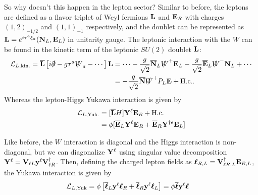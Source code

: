 So why doesn't this happen in the lepton sector? Similar to before, the leptons are defined as a flavor triplet of Weyl fermions ${\bf L}$ and ${\bf E}_R$ with charges $(1, 2)_{-1/2}$ and $(1, 1)_{-1}$ respectively, and the doublet can be represented as ${\bf L} = e^{i\tau^a\xi_a}({\bf N}_L, {\bf E}_L)$ in unitarity gauge. The leptonic interaction with the $W$ can be found in the kinetic term of the leptonic $SU(2)$ doublet ${\bf L}$:
\begin{align}
{\cal L}_{L,{\rm kin}.} = \overline{\bf L}\left[i\slashed{\partial} - g\tau^a \slashed{W}_a - \cdots \right]{\bf L} &= \cdots -\frac{g}{\sqrt{2}}\overline{\bf N}_L\slashed{W}^+{\bf E}_L -\frac{g}{\sqrt{2}}\overline{\bf E}_L\slashed{W}^-{\bf N}_L + \cdots \nonumber \\
&= -\frac{g}{\sqrt{2}}\overline{\bf N}\slashed{W}^+P_L{\bf E} + {\rm H.c.}.
\end{align}
Whereas the lepton-Higgs Yukawa interaction is given by
\begin{align}
{\cal L}_{L,{\rm Yuk}.} &= [\overline{\bf L}H]{\bf Y}^\ell{\bf E}_R + {\rm H.c.}\nonumber \\
&= \phi [\overline{\bf E}_L{\bf Y}^\ell{\bf E}_R+\overline{\bf E}_R{\bf Y}^{\dagger e}{\bf E}_L]
\end{align}

Like before, the $W$ interaction is diagonal and the Higgs interaction is non-diagonal, but we can diagonalize ${\bf Y}^\ell$ using singular value decomposition ${\bf Y}^\ell = {\bf V}_{\ell L} {\bf y}^\ell{\bf V}_{\ell R}^\dagger$. Then, defining the charged lepton fields as ${\boldsymbol\ell}_{R,L} = {\bf V}_{\ell R,L}^\dagger{\bf E}_{R,L}$, the Yukawa interaction is given by
\begin{align}
    {\cal L}_{L,{\rm Yuk}} &= \phi\left[\overline{\boldsymbol \ell}_L{\bf y}^\ell {\boldsymbol \ell}_R + \overline{\boldsymbol \ell}_R{\bf y}^\ell {\boldsymbol \ell}_L\right]= \phi \overline{\boldsymbol \ell}{\bf y}^\ell{\boldsymbol\ell}
\end{align}

